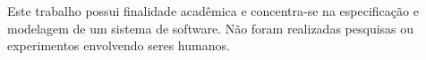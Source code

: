 \documentclass[portuguese]{sbcreviews-2025}
\begin{document}
\begin{declarations}
\begin{furtherinformation}
Este trabalho possui finalidade acadêmica e concentra-se na especificação e modelagem de um sistema de software. Não foram realizadas pesquisas ou experimentos envolvendo seres humanos.
\end{furtherinformation}

\end{declarations}




\end{document}

